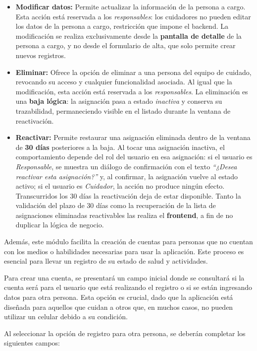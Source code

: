 \documentclass[a4paper,12pt]{article}
\begin{document}
    \begin{itemize}
        \item \textbf{Modificar datos:} Permite actualizar la información de la persona a cargo. Esta acción está reservada a los \textit{responsables}: los cuidadores no pueden editar los datos de la persona a cargo, restricción que impone el backend. La modificación se realiza exclusivamente desde la \textbf{pantalla de detalle} de la persona a cargo, y no desde el formulario de alta, que solo permite crear nuevos registros.
        \item \textbf{Eliminar:} Ofrece la opción de eliminar a una persona del equipo de cuidado, revocando su acceso y cualquier funcionalidad asociada. Al igual que la modificación, esta acción está reservada a los \textit{responsables}. La eliminación es una \textbf{baja lógica}: la asignación pasa a estado \textit{inactiva} y conserva su trazabilidad, permaneciendo visible en el listado durante la ventana de reactivación.
        \item \textbf{Reactivar:} Permite restaurar una asignación eliminada dentro de la ventana de \textbf{30 días} posteriores a la baja. Al tocar una asignación inactiva, el comportamiento depende del rol del usuario en esa asignación: si el usuario es \textit{Responsable}, se muestra un diálogo de confirmación con el texto \textit{“¿Desea reactivar esta asignación?”} y, al confirmar, la asignación vuelve al estado activo; si el usuario es \textit{Cuidador}, la acción no produce ningún efecto. Transcurridos los 30 días la reactivación deja de estar disponible. Tanto la validación del plazo de 30 días como la recuperación de la lista de asignaciones eliminadas reactivables las realiza el \textbf{frontend}, a fin de no duplicar la lógica de negocio.
    \end{itemize}
    \par Además, este módulo facilita la creación de cuentas para personas que no cuentan con los medios o habilidades necesarias para usar la aplicación. Este proceso es esencial para llevar un registro de su estado de salud y actividades.
    \par Para crear una cuenta, se presentará un campo inicial donde se consultará si la cuenta será para el usuario que está realizando el registro o si se están ingresando datos para otra persona. Esta opción es crucial, dado que la aplicación está diseñada para aquellos que cuidan a otros que, en muchos casos, no pueden utilizar un celular debido a su condición.
    \par Al seleccionar la opción de registro para otra persona, se deberán completar los siguientes campos:
\end{document}
